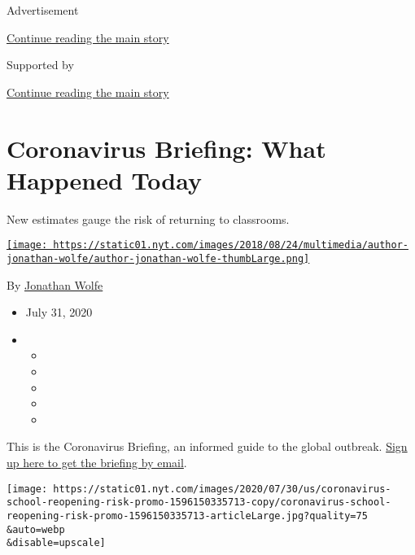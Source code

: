 Advertisement

\protect\hyperlink{after-top}{Continue reading the main story}

Supported by

\protect\hyperlink{after-sponsor}{Continue reading the main story}

\hypertarget{coronavirus-briefing-what-happened-today}{%
\section{Coronavirus Briefing: What Happened
Today}\label{coronavirus-briefing-what-happened-today}}

New estimates gauge the risk of returning to classrooms.

\href{https://www.nytimes.com/by/jonathan-wolfe}{\texttt{[image: https://static01.nyt.com/images/2018/08/24/multimedia/author-jonathan-wolfe/author-jonathan-wolfe-thumbLarge.png]}}

By \href{https://www.nytimes.com/by/jonathan-wolfe}{Jonathan Wolfe}

\begin{itemize}
\item
  July 31, 2020
\item
  \begin{itemize}
  \item
  \item
  \item
  \item
  \item
  \end{itemize}
\end{itemize}

This is the Coronavirus Briefing, an informed guide to the global
outbreak.
\href{https://www.nytimes.com/newsletters/coronavirus-briefing}{Sign up
here to get the briefing by email}.

\texttt{[image: https://static01.nyt.com/images/2020/07/30/us/coronavirus-school-reopening-risk-promo-1596150335713-copy/coronavirus-school-reopening-risk-promo-1596150335713-articleLarge.jpg?quality=75\\\&auto=webp\\\&disable=upscale]}

